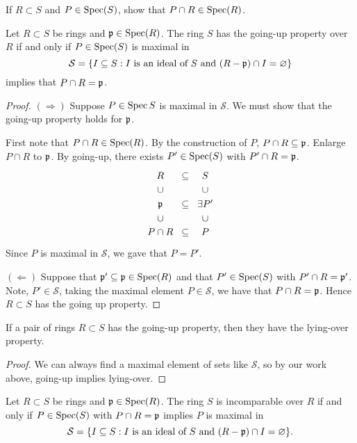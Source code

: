 \documentclass{ximera}
\begin{document}
\begin{exercise}
  If $R\subset S$ and $P\in\operatorname{Spec}(S)$, show that $P\cap R\in\operatorname{Spec}(R)$.
\end{exercise}


\begin{proposition}
  Let $R\subset S$ be rings and $\mathfrak{p}\in\operatorname{Spec}(R)$. The ring $S$ has the
  going-up property over $R$ if and only if $P\in\operatorname{Spec}(S)$ is maximal in
  \[
  \mathcal{S} = \{I\subseteq S: \text{$I$ is an ideal of $S$ and
    $(R-\mathfrak{p})\cap I = \varnothing$}\}
  \]
  implies that $P\cap R = \mathfrak{p}$.
  \begin{proof}
    $(\Rightarrow)$ Suppose $P\in\operatorname{Spec}{S}$ is maximal in
    $\mathcal{S}$. We must show that the going-up property holds for
    $\mathfrak{p}$.

    First note that $P\cap R\in\operatorname{Spec}(R)$. By the construction of $P$,
    $P\cap R\subseteq \mathfrak{p}$. Enlarge $P\cap R$ to $\mathfrak{p}$.  By going-up,
    there exists $P'\in\operatorname{Spec}(S)$ with $P'\cap R = \mathfrak{p}$.
    \[
    \begin{tikzcd}[row sep=0em,column sep=0em]
      R    & \subset & S \\
      \cup &         & \cup \\
      \p & \subset & \exists P' \\
      \cup &         & \cup \\
      P\cap R & \subset & P  
    \end{tikzcd}
    \]
    Since $P$ is maximal in $\mathcal{S}$, we gave that $P=P'$.

    $(\Leftarrow)$ Suppose that $\mathfrak{p}'\subseteq\mathfrak{p}\in\operatorname{Spec}(R)$ and that
    $P'\in\operatorname{Spec}(S)$ with $P'\cap R = \mathfrak{p}'$. Note, $P'\in\mathcal{S}$,
    taking the maximal element $P\in\mathcal{S}$, we have that $P\cap
    R = \mathfrak{p}$. Hence $R\subset S$ has the going up property.
  \end{proof}
\end{proposition}


\begin{corollary}
  If a pair of rings $R\subset S$ has the going-up property, then they
  have the lying-over property.
  \begin{proof}
    We can always find a maximal element of sets like $\mathcal{S}$,
    so by our work above, going-up implies lying-over.
  \end{proof}
\end{corollary}


\begin{proposition}
  Let $R\subset S$ be rings and $\mathfrak{p}\in\operatorname{Spec}(R)$. The ring $S$ is
  incomparable over $R$ if and only if $P\in\operatorname{Spec}(S)$ with $P\cap R
  =\mathfrak{p}$ implies $P$ is maximal in
  \[
  \mathcal{S} = \{I\subseteq S: \text{$I$ is an ideal of $S$ and
    $(R-\mathfrak{p})\cap I = \varnothing$}\}.
  \]
\end{proposition}
\end{document}
